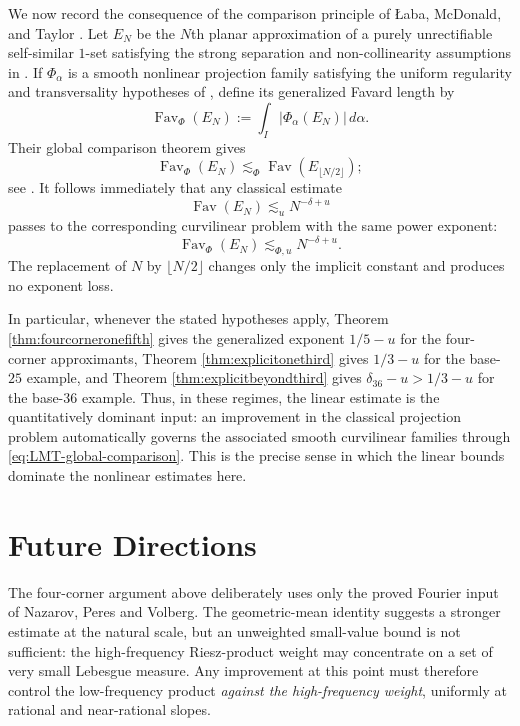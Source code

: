 \documentclass[12pt]{amsart}
\numberwithin{equation}{section}
\DeclareMathOperator{\Fav}{Fav}
\begin{document}
We now record the consequence of the comparison principle of {\L}aba,
McDonald, and Taylor \cite{LMT}.  Let $E_N$ be the $N$th planar approximation
of a purely unrectifiable self-similar $1$-set satisfying the strong separation
and non-collinearity assumptions in \cite[Section 2.2]{LMT}.  If
$\Phi_\alpha$ is a smooth nonlinear projection family satisfying the uniform
regularity and transversality hypotheses of \cite[Theorem 2.2]{LMT}, define
its generalized Favard length by
\[
 \Fav_\Phi(E_N):=\int_I |\Phi_\alpha(E_N)|\,d\alpha.
\]
Their global comparison theorem gives
\begin{equation}\label{eq:LMT-global-comparison}
 \Fav_\Phi(E_N)
 \lesssim_\Phi
 \Fav(E_{\lfloor N/2\rfloor});
\end{equation}
see \cite[Theorem 2.4]{LMT}.  It follows immediately that any classical
estimate
\[
 \Fav(E_N)\lesssim_u N^{-\delta+u}
\]
passes to the corresponding curvilinear problem with the same power exponent:
\begin{equation}\label{eq:LMT-power-transfer}
 \Fav_\Phi(E_N)\lesssim_{\Phi,u}N^{-\delta+u}.
\end{equation}
The replacement of $N$ by $\lfloor N/2\rfloor$ changes only the implicit
constant and produces no exponent loss.

In particular, whenever the stated hypotheses apply, Theorem
\ref{thm:fourcorneronefifth} gives the generalized exponent $1/5-u$ for the
four-corner approximants, Theorem \ref{thm:explicitonethird} gives $1/3-u$
for the base-$25$ example, and Theorem \ref{thm:explicitbeyondthird} gives
$\delta_{36}-u>1/3-u$ for the base-$36$ example.  Thus, in these regimes, the
linear estimate is the quantitatively dominant input: an improvement in the
classical projection problem automatically governs the associated smooth
curvilinear families through \eqref{eq:LMT-global-comparison}.  This is the
precise sense in which the linear bounds dominate the nonlinear estimates
here.

\section*{Future Directions}

The four-corner argument above deliberately uses only the proved Fourier
input of Nazarov, Peres and Volberg.  The geometric-mean identity suggests a stronger estimate at the
natural scale, but an unweighted small-value bound is not sufficient: the
high-frequency Riesz-product weight may concentrate on a set of very small
Lebesgue measure.  Any improvement at this point must therefore control the
low-frequency product \emph{against the high-frequency weight}, uniformly at
rational and near-rational slopes.
\end{document}
